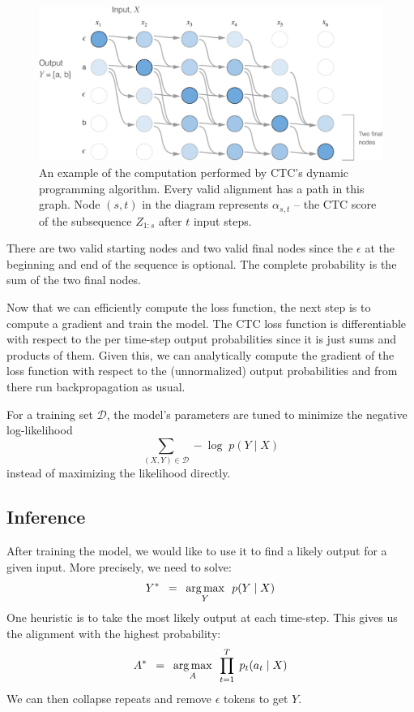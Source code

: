 \begin{figure}
\centering
    \includegraphics[width=\textwidth]{background/figures/ctc_cost.pdf}
\caption{An example of the computation performed by CTC's dynamic programming
    algorithm. Every valid alignment has a path in this graph. Node $(s, t)$ in
    the diagram represents $\alpha_{s, t}$ – the CTC score of the subsequence
    $Z_{1:s}$ after $t$ input steps.}
\end{figure}

There are two valid starting nodes and two valid final nodes since the
$\epsilon$ at the beginning and end of the sequence is optional. The complete
probability is the sum of the two final nodes.

Now that we can efficiently compute the loss function, the next step is to
compute a gradient and train the model. The CTC loss function is differentiable
with respect to the per time-step output probabilities since it is just sums
and products of them. Given this, we can analytically compute the gradient of
the loss function with respect to the (unnormalized) output probabilities and
from there run backpropagation as usual.

For a training set $\mathcal{D}$, the model's parameters are tuned to minimize
the negative log-likelihood
\[
\sum_{(X, Y) \in \mathcal{D}} -\log\; p(Y \mid X)
\]
instead of maximizing the likelihood directly.

\subsection{Inference}

After training the model, we would like to use it to find a likely output for a
given input. More precisely, we need to solve:
\[
Y^* \enspace = \enspace \operatorname*{arg\,max}_Y \enspace p(Y \mid X)
\]
One heuristic is to take the most likely output at each time-step. This gives
us the alignment with the highest probability:
\[
A^* \enspace = \enspace \operatorname*{arg\,max}_A \enspace  \prod_{t=1}^{T} \; p_t(a_t \mid X)
\]
We can then collapse repeats and remove $\epsilon$ tokens to get $Y$.

